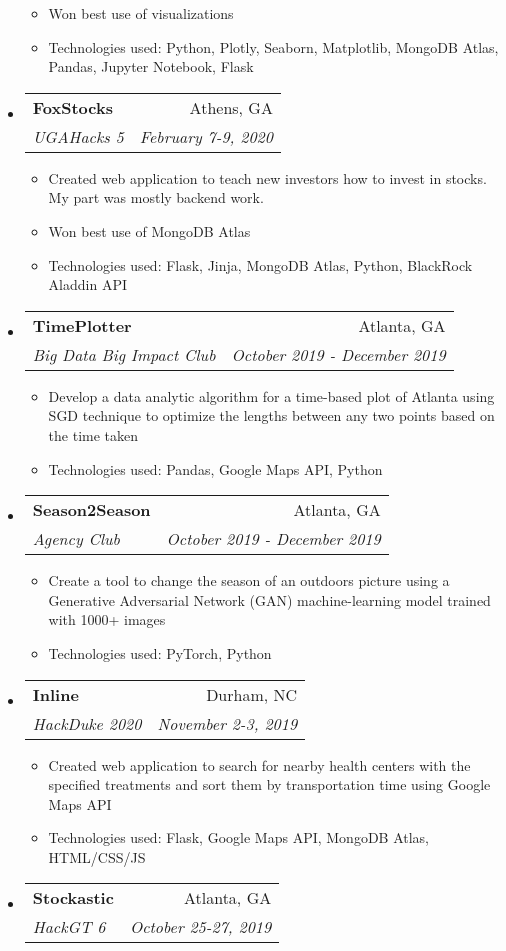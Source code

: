 \documentclass[letterpaper,11pt]{article}
\makeatletter
\newcommand{\resitem}[1]{\item #1 \vspace{-2pt}}
\newcommand{\ressubheading}[4]{
\begin{tabular*}{7.0in}{l@{\extracolsep{\fill}}r}
		\textbf{#1} & #2 \\
		\textit{#3} & \textit{#4} \\
\end{tabular*}\vspace{-6pt}}
\makeatother
\begin{document}
\begin{itemize}
\begin{itemize}
        \resitem{Won best use of visualizations}
        \resitem{Technologies used: Python, Plotly, Seaborn, Matplotlib, MongoDB Atlas, Pandas, Jupyter Notebook, Flask}
    \end{itemize}
\item
    \ressubheading{FoxStocks}{Athens, GA}{UGAHacks 5}{February 7-9, 2020}
    \begin{itemize}
        \item Created web application to teach new investors how to invest in stocks. My part was mostly backend work. 
        \item Won best use of MongoDB Atlas
        \item Technologies used: Flask, Jinja, MongoDB Atlas, Python, BlackRock Aladdin API
    \end{itemize}
\item
    \ressubheading{TimePlotter}{Atlanta, GA}{Big Data Big Impact Club}{October 2019 - December 2019}
    \begin{itemize}
        \item Develop a data analytic algorithm for a time-based plot of Atlanta using SGD technique to optimize the lengths between any two points based on the time taken
        \item Technologies used: Pandas, Google Maps API, Python
    \end{itemize}
\item
    \ressubheading{Season2Season}{Atlanta, GA}{Agency Club}{October 2019 - December 2019}
    \begin{itemize}
        \item Create a tool to change the season of an outdoors picture using a Generative Adversarial Network (GAN) machine-learning model trained with 1000+ images
        \item Technologies used: PyTorch, Python
    \end{itemize}
\item
    \ressubheading{Inline}{Durham, NC}{HackDuke 2020}{November 2-3, 2019}
    \begin{itemize}
        \item Created web application to search for nearby health centers with the specified treatments and sort them by transportation time using Google Maps API
        \item Technologies used: Flask, Google Maps API, MongoDB Atlas, HTML/CSS/JS
    \end{itemize}
\item
    \ressubheading{Stockastic}{Atlanta, GA}{HackGT 6}{October 25-27, 2019}

\end{itemize}
\end{document}
